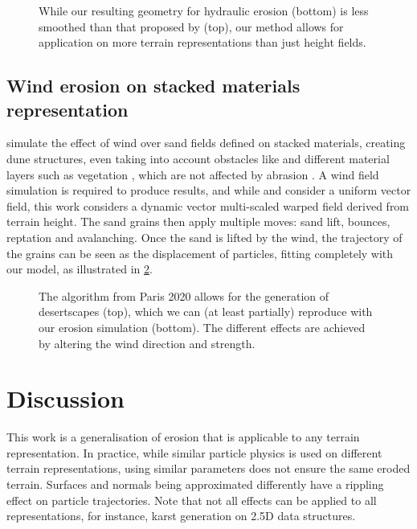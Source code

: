 \begin{figure}
    \centering
    \caption{While our resulting geometry for hydraulic erosion (bottom) is less smoothed than that proposed by \cite{Mei2007} (top), our method allows for application on more terrain representations than just height fields.}
    \label{fig:erosion-screen-mei2007-1}
\end{figure}

\subsection{Wind erosion on stacked materials representation}

\citep{Paris2019b} simulate the effect of wind over sand fields defined on stacked materials, creating dune structures, even taking into account obstacles like \cite{Roa2004} and different material layers such as vegetation \cite{Cordonnier2017a}, which are not affected by abrasion \cite{Paris2019b}. A wind field simulation is required to produce results, and while \cite{Roa2004} and \cite{Onoue2000} consider a uniform vector field, this work considers a dynamic vector multi-scaled warped field derived from terrain height. The sand grains then apply multiple moves: sand lift, bounces, reptation and avalanching. Once the sand is lifted by the wind, the trajectory of the grains can be seen as the displacement of particles, fitting completely with our model, as illustrated in \cref{fig:erosion-screen-paris2020}.

\begin{figure}
    \centering
    \caption{The algorithm from Paris 2020 allows for the generation of desertscapes (top), which we can (at least partially) reproduce with our erosion simulation (bottom). The different effects are achieved by altering the wind direction and strength.}
    \label{fig:erosion-screen-paris2020}
\end{figure}




\section{Discussion}
This work is a generalisation of erosion that is applicable to any terrain representation. In practice, while similar particle physics is used on different terrain representations, using similar parameters does not ensure the same eroded terrain. Surfaces and normals being approximated differently have a rippling effect on particle trajectories.  
Note that not all effects can be applied to all representations, for instance, karst generation on 2.5D data structures.


